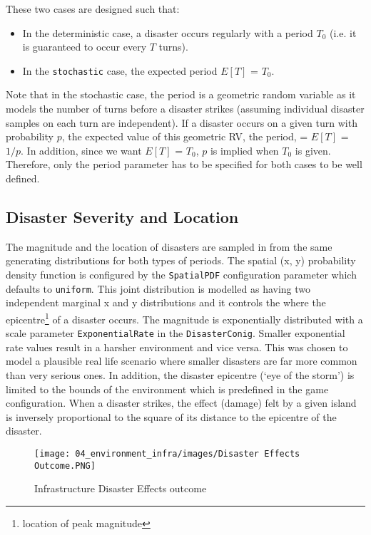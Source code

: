 These two cases are designed such that:
\begin{itemize}
    \item In the deterministic case, a disaster occurs regularly with a period $T_{0}$ (i.e. it is guaranteed to occur every $T$ turns).
    \item In the \texttt{stochastic} case, the expected period $E[T]$ = $T_0$.
\end{itemize}

Note that in the stochastic case, the period is a geometric random variable as it models the number of turns before a disaster strikes (assuming individual disaster samples on each turn are independent). If a disaster occurs on a given turn with probability $p$, the expected value of this geometric RV, the period, = $E[T]$ = $1/p$. In addition, since we want
$E[T]$ = $T_{0}$, $p$ is implied when $T_{0}$ is given. Therefore, only the period parameter has to be specified for both cases to be well defined.

\subsection {Disaster Severity and Location}

The magnitude and the location of disasters are sampled in from the same generating distributions for both types of periods.
The spatial (x, y) probability density function is configured by the \texttt{SpatialPDF} configuration parameter which defaults to \texttt{uniform}. This joint distribution is modelled as having two independent marginal x and y distributions and it controls the where the epicentre\footnote{location of peak magnitude} of a disaster occurs. The magnitude is exponentially distributed with a scale parameter \texttt{ExponentialRate} in the \texttt{DisasterConig}. Smaller exponential rate values result in a harsher environment and vice versa. This was chosen to model a plausible real life scenario where smaller disasters are far more common than very serious ones.
In addition, the disaster epicentre (`eye of the storm') is limited to the bounds of the environment which is predefined in the game configuration. When a disaster strikes, the effect (damage) felt by a given island is inversely proportional to the square of its distance to the epicentre of the disaster.

\begin{figure}[!htb]
    \centering
    \texttt{[image: 04\_environment\_infra/images/Disaster Effects Outcome.PNG]}
    \caption{Infrastructure Disaster Effects outcome}
    \label{fig:Disaster Effects Outcome}
\end{figure}

